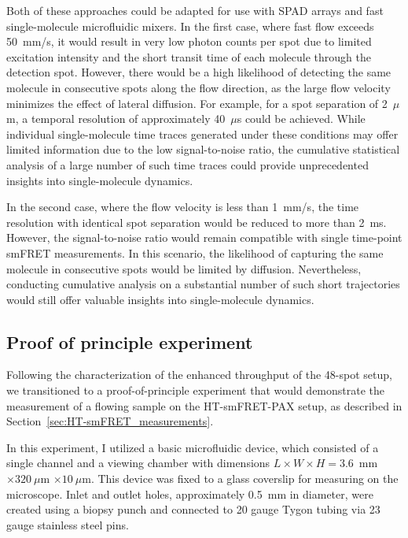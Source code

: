 Both of these approaches could be adapted for use with \ac{SPAD} arrays and fast single-molecule microfluidic mixers. 
In the first case, where fast flow exceeds 50~mm/s, it would result in very low photon counts per spot due to limited excitation intensity and the short transit time of each molecule through the detection spot. 
However, there would be a high likelihood of detecting the same molecule in consecutive spots along the flow direction, as the large flow velocity minimizes the effect of lateral diffusion. 
For example, for a spot separation of 2~$\mu$m, a temporal resolution of approximately 40~$\mu$s could be achieved. 
While individual single-molecule time traces generated under these conditions may offer limited information due to the low signal-to-noise ratio, the cumulative statistical analysis of a large number of such time traces could provide unprecedented insights into single-molecule dynamics.

In the second case, where the flow velocity is less than 1~mm/s, the time resolution with identical spot separation would be reduced to more than 2~ms. 
However, the signal-to-noise ratio would remain compatible with single time-point \ac{smFRET} measurements. 
In this scenario, the likelihood of capturing the same molecule in consecutive spots would be limited by diffusion. 
Nevertheless, conducting cumulative analysis on a substantial number of such short trajectories would still offer valuable insights into single-molecule dynamics.

\subsection{Proof of principle experiment}
\label{sec:microfluidics_experiment}

Following the characterization of the enhanced throughput of the 48-spot setup, we transitioned to a proof-of-principle experiment that would demonstrate the measurement of a flowing sample on the \ac{HT-smFRET}-PAX setup, as described in Section~\ref{sec:HT-smFRET_measurements}.

In this experiment, I utilized a basic microfluidic device, which consisted of a single channel and a viewing chamber with dimensions $L \times W \times H = 3.6$~mm $\times  320~\mu$m $\times 10~\mu$m. 
This device was fixed to a glass coverslip for measuring on the microscope.
Inlet and outlet holes, approximately 0.5~mm in diameter, were created using a biopsy punch and connected to 20 gauge Tygon tubing via 23 gauge stainless steel pins.


